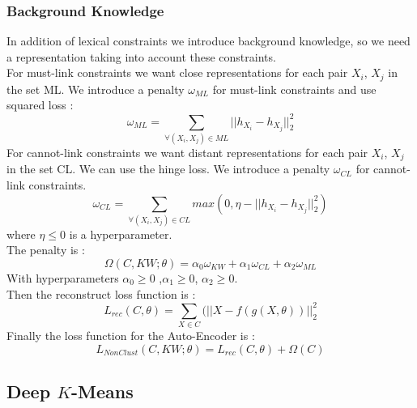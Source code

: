 \subsubsection{Background Knowledge}
In addition of lexical constraints we introduce background knowledge, so we need
a representation taking into account these constraints.\\
For must-link constraints we want close representations for each pair $X_i$, $X_j$
in the set ML. We introduce a penalty $\omega_{ML}$ for must-link
constraints and use squared loss :
\begin{equation}\label{eq:omegaML}
  \omega_{ML} = \sum_{\forall{(X_i,X_j)\in ML}} || h_{X_i} - h_{X_j} ||_2^2
\end{equation}
For cannot-link constraints we want distant representations for each pair $X_i$,
$X_j$ in the set CL.
We can use the hinge loss.
We introduce a penalty $\omega_{CL}$ for cannot-link constraints.
\begin{equation}\label{eq:omegaCL}
  \omega_{CL} = \sum_{\forall{(X_i,X_j)\in CL}} max(0,
  \eta - || h_{X_i} - h_{X_j} ||_2^2)
\end{equation}
where $\eta \le 0$ is a hyperparameter.\\
The penalty is :
\begin{equation}\label{eq:Sparse}
  \Omega(C,KW;\theta) = \alpha_0\omega_{KW} + \alpha_1\omega_{CL} + \alpha_2\omega_{ML}  
\end{equation}
With hyperparameters $\alpha_0\geq 0$ ,$\alpha_1\geq 0$, $\alpha_2\geq 0$.
\\Then the reconstruct loss function is :
\begin{equation}\label{eq:AEDK}
  L_{rec}(C, \theta) = \sum_{X \in C}(||X - f(g(X, \theta))||_2^2
\end{equation}
Finally the loss function for the Auto-Encoder is :
\begin{equation}\label{eq:AE}
  L_{NonClust}(C,KW; \theta) = L_{rec}(C, \theta) + \Omega(C)  
\end{equation}

\subsection{Deep $K$-Means}

